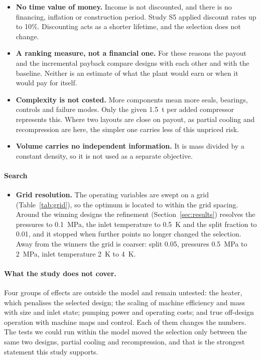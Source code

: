 \begin{itemize}
  \item \textbf{No time value of money.} Income is not discounted, and there is no financing, inflation or construction period. Study S5 applied discount rates up to 10\%. Discounting acts as a shorter lifetime, and the selection does not change.
  \item \textbf{A ranking measure, not a financial one.} For these reasons the payout and the incremental payback compare designs with each other and with the baseline. Neither is an estimate of what the plant would earn or when it would pay for itself.
  \item \textbf{Complexity is not costed.} More components mean more seals, bearings, controls and failure modes. Only the given \SI{1.5}{t} per added compressor represents this. Where two layouts are close on payout, as partial cooling and recompression are here, the simpler one carries less of this unpriced risk.
  \item \textbf{Volume carries no independent information.} It is mass divided by a constant density, so it is not used as a separate objective.
\end{itemize}

\paragraph{Search}
\begin{itemize}
  \item \textbf{Grid resolution.} The operating variables are swept on a grid (Table~\ref{tab:grid}), so the optimum is located to within the grid spacing. Around the winning designs the refinement (Section~\ref{sec:results}) resolves the pressures to \SI{0.1}{MPa}, the inlet temperature to \SI{0.5}{K} and the split fraction to 0.01, and it stopped when further points no longer changed the selection. Away from the winners the grid is coarser: split 0.05, pressures \SI{0.5}{MPa} to \SI{2}{MPa}, inlet temperature \SI{2}{K} to \SI{4}{K}.
\end{itemize}

\paragraph{What the study does not cover.} Four groups of effects are outside the model and remain untested: the heater, which penalises the selected design; the scaling of machine efficiency and mass with size and inlet state; pumping power and operating costs; and true off-design operation with machine maps and control. Each of them changes the numbers. The tests we could run within the model moved the selection only between the same two designs, partial cooling and recompression, and that is the strongest statement this study supports.
